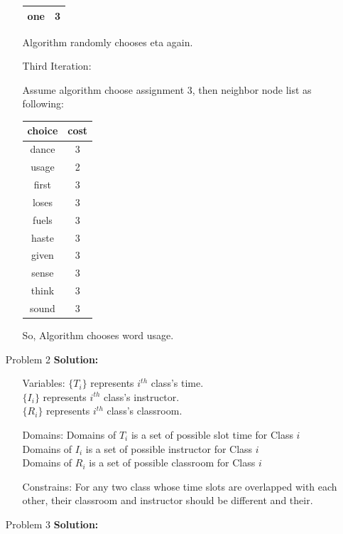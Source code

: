 \normalfont\documentclass[letterpaper,11pt]{article}
\begin{document}
\begin{enumerate}
\begin{enumerate}
\begin{table}[!hbp]
\begin{tabular}{cc}
				one& 3\\
				\hline
				\end{tabular}
			\end{table}
			Algorithm randomly chooses eta again.
		\item[Third Iteration:]\par
		Assume algorithm choose assignment $3$, then neighbor node list as following:\par
			\begin{table}[!hbp]
			\center
				\begin{tabular}{cc}
				\hline
				choice & cost\\
				\hline
				dance& 3\\
				usage& 2\\
				first& 3\\
				loses& 3\\
				fuels& 3\\
				haste& 3\\
				given& 3\\
				sense& 3\\
				think& 3\\
				sound& 3\\
				\hline
				\end{tabular}
			\end{table}
			So, Algorithm chooses word usage.
	\end{enumerate}
\item[Problem 2]\textbf{Solution:}\par
	\begin{enumerate}
		\item[Variables:]
			$\{T_i\}$ represents $i^{th}$ class's time.\\
			$\{I_i\}$ represents $i^{th}$ class's instructor.\\
			$\{R_i\}$ represents $i^{th}$ class's classroom.\\
		\item[Domains:]
			Domains of $T_i$ is a set of possible slot time for Class $i$\\
			Domains of $I_i$ is a set of possible instructor for Class $i$\\
			Domains of $R_i$ is a set of possible classroom for Class $i$\\
		\item[Constrains:]
			For any two class whose time slots are overlapped with each other, their classroom and instructor should be different and their.
	\end{enumerate}
\item [Problem 3]\textbf{Solution:}\par

\end{enumerate}
\end{document}
